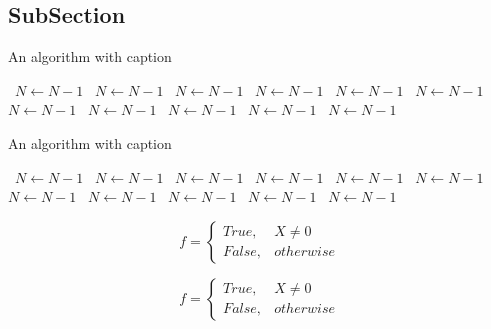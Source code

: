 \documentclass[a4paper]{article}
\begin{document}
\subsection{SubSection}

\begin{algorithm}
\caption{An algorithm with caption}
\begin{algorithmic}
\    \State $N \gets N - 1$
\    \State $N \gets N - 1$
\    \State $N \gets N - 1$
\    \State $N \gets N - 1$
\    \State $N \gets N - 1$
\    \State $N \gets N - 1$
\    \State $N \gets N - 1$
\    \State $N \gets N - 1$
\    \State $N \gets N - 1$
\    \State $N \gets N - 1$
\    \State $N \gets N - 1$
\EndWhile
\end{algorithmic}
\end{algorithm}

\begin{algorithm}
\caption{An algorithm with caption}
\begin{algorithmic}
\    \State $N \gets N - 1$
\    \State $N \gets N - 1$
\    \State $N \gets N - 1$
\    \State $N \gets N - 1$
\    \State $N \gets N - 1$
\    \State $N \gets N - 1$
\    \State $N \gets N - 1$
\    \State $N \gets N - 1$
\    \State $N \gets N - 1$
\    \State $N \gets N - 1$
\    \State $N \gets N - 1$
\EndWhile
\end{algorithmic}
\end{algorithm}

\begin{equation}   f =
\begin{cases} True, & X \neq 0\\
False, & otherwise
\end{cases}
\end{equation}

\begin{equation}   f =
\begin{cases} True, & X \neq 0\\
False, & otherwise
\end{cases}
\end{equation}
\end{document}
